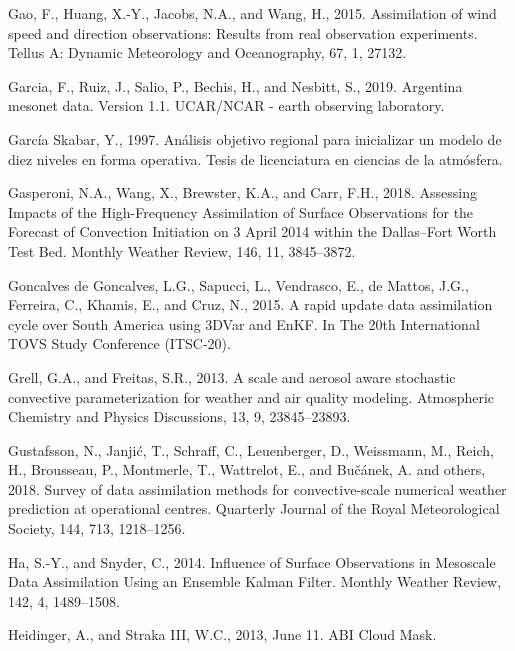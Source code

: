 \documentclass[12pt,oneside,a4paper]{reedthesis}
\begin{document}
\leavevmode\hypertarget{ref-gao2015}{}%
Gao, F., Huang, X.-Y., Jacobs, N.A., and Wang, H., 2015. Assimilation of wind speed and direction observations: Results from real observation experiments. Tellus A: Dynamic Meteorology and Oceanography, 67, 1, 27132.

\leavevmode\hypertarget{ref-garcia2019}{}%
Garcia, F., Ruiz, J., Salio, P., Bechis, H., and Nesbitt, S., 2019. Argentina mesonet data. Version 1.1. UCAR/NCAR - earth observing laboratory.

\leavevmode\hypertarget{ref-garciaskabar1997}{}%
García Skabar, Y., 1997. Análisis objetivo regional para inicializar un modelo de diez niveles en forma operativa. Tesis de licenciatura en ciencias de la atmósfera.

\leavevmode\hypertarget{ref-gasperoni2018}{}%
Gasperoni, N.A., Wang, X., Brewster, K.A., and Carr, F.H., 2018. Assessing Impacts of the High-Frequency Assimilation of Surface Observations for the Forecast of Convection Initiation on 3 April 2014 within the Dallas--Fort Worth Test Bed. Monthly Weather Review, 146, 11, 3845--3872.

\leavevmode\hypertarget{ref-goncalvesdegoncalves2015}{}%
Goncalves de Goncalves, L.G., Sapucci, L., Vendrasco, E., de Mattos, J.G., Ferreira, C., Khamis, E., and Cruz, N., 2015. A rapid update data assimilation cycle over South America using 3DVar and EnKF. In The 20th International TOVS Study Conference (ITSC-20).

\leavevmode\hypertarget{ref-grell2013}{}%
Grell, G.A., and Freitas, S.R., 2013. A scale and aerosol aware stochastic convective parameterization for weather and air quality modeling. Atmospheric Chemistry and Physics Discussions, 13, 9, 23845--23893.

\leavevmode\hypertarget{ref-gustafsson2018}{}%
Gustafsson, N., Janjić, T., Schraff, C., Leuenberger, D., Weissmann, M., Reich, H., Brousseau, P., Montmerle, T., Wattrelot, E., and Bučánek, A. and others, 2018. Survey of data assimilation methods for convective‐scale numerical weather prediction at operational centres. Quarterly Journal of the Royal Meteorological Society, 144, 713, 1218--1256.

\leavevmode\hypertarget{ref-ha2014}{}%
Ha, S.-Y., and Snyder, C., 2014. Influence of Surface Observations in Mesoscale Data Assimilation Using an Ensemble Kalman Filter. Monthly Weather Review, 142, 4, 1489--1508.

\leavevmode\hypertarget{ref-heidinger2013}{}%
Heidinger, A., and Straka III, W.C., 2013, June 11. ABI Cloud Mask.
\end{document}
